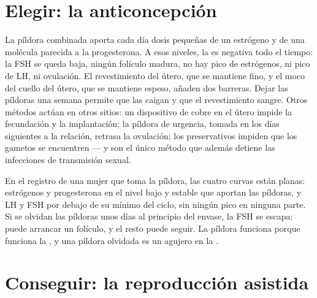 \section{Elegir: la anticoncepción}

\begin{proposition}\label{prop:g11:hormones-and-reproduction:contraception}
La píldora combinada aporta cada día dosis pequeñas de un estrógeno y
de una molécula parecida a la progesterona. A esos niveles, la
 es negativa todo el tiempo: la FSH se queda baja,
ningún folículo madura, no hay pico de estrógenos, ni pico de LH, ni
ovulación. El revestimiento del útero, que se mantiene fino, y el moco
del cuello del útero, que se mantiene espeso, añaden dos barreras.
Dejar las píldoras una semana permite que las  caigan y que el
revestimiento sangre. Otros métodos actúan en otros sitios: un
dispositivo de cobre en el útero impide la fecundación y la
implantación; la píldora de urgencia, tomada en los días siguientes a
la relación, retrasa la ovulación; los preservativos impiden que los
gametos se encuentren --- y son el único método que además detiene las
infecciones de transmisión sexual.
\end{proposition}
\admitted

\begin{example}\label{ex:g11:hormones-and-reproduction:pill}
En el registro de una mujer que toma la píldora, las cuatro curvas
están planas: estrógenos y progesterona en el nivel bajo y estable que
aportan las píldoras, y LH y FSH por debajo de su mínimo del ciclo, sin
ningún pico en ninguna parte. Si se olvidan las píldoras unos días al
principio del envase, la FSH se escapa: puede arrancar un folículo, y
el resto puede seguir. La píldora funciona porque funciona la
, y una píldora olvidada es un agujero en la
.
\end{example}

\section{Conseguir: la reproducción asistida}

